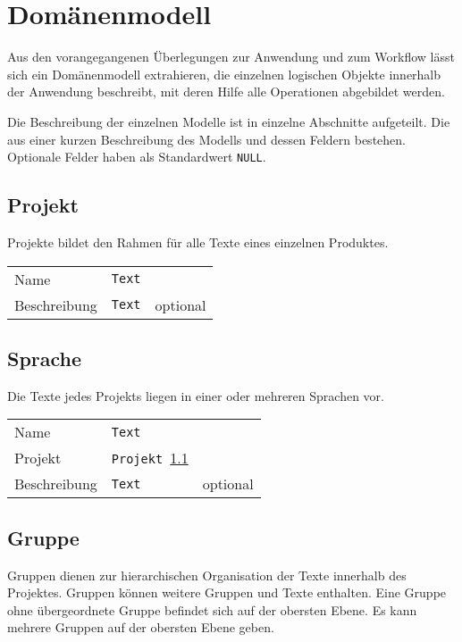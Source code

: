 \section{Domänenmodell}\label{l:domänenmodell}

Aus den vorangegangenen Überlegungen zur Anwendung und zum Workflow lässt sich ein Domänenmodell extrahieren, die einzelnen logischen Objekte innerhalb der Anwendung beschreibt, mit deren Hilfe alle Operationen abgebildet werden.

Die Beschreibung der einzelnen Modelle ist in einzelne Abschnitte aufgeteilt. Die aus einer kurzen Beschreibung des Modells und dessen Feldern bestehen. Optionale Felder haben als Standardwert \texttt{NULL}.

\subsection{Projekt}\label{model:projekt}

Projekte bildet den Rahmen für alle Texte eines einzelnen Produktes.

\begin{tabular}{@{}l l l}
\hline
Name&\texttt{Text}&\\
Beschreibung&\texttt{Text}&optional\\
\hline
\end{tabular}

\subsection{Sprache}\label{model:sprache}

Die Texte jedes Projekts liegen in einer oder mehreren Sprachen vor.

\begin{tabular}{@{}l l l}
\hline
Name&\texttt{Text}&\\
Projekt&\texttt{Projekt \ref{model:projekt}}&\\
Beschreibung&\texttt{Text}&optional\\
\hline
\end{tabular}

\subsection{Gruppe}\label{model:gruppe}

Gruppen dienen zur hierarchischen Organisation der Texte innerhalb des Projektes. Gruppen können weitere Gruppen und Texte enthalten. Eine Gruppe ohne übergeordnete Gruppe befindet sich auf der obersten Ebene. Es kann mehrere Gruppen auf der obersten Ebene geben.

